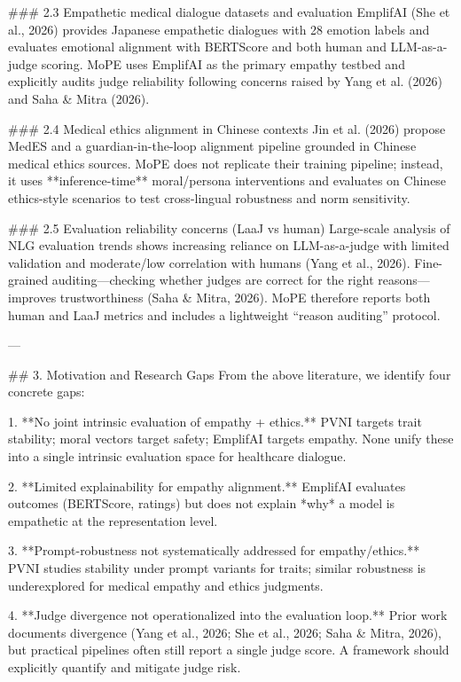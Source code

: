 ### 2.3 Empathetic medical dialogue datasets and evaluation  
EmplifAI (She et al., 2026) provides Japanese empathetic dialogues with 28 emotion labels and evaluates emotional alignment with BERTScore and both human and LLM-as-a-judge scoring. MoPE uses EmplifAI as the primary empathy testbed and explicitly audits judge reliability following concerns raised by Yang et al. (2026) and Saha & Mitra (2026).

### 2.4 Medical ethics alignment in Chinese contexts  
Jin et al. (2026) propose MedES and a guardian-in-the-loop alignment pipeline grounded in Chinese medical ethics sources. MoPE does not replicate their training pipeline; instead, it uses **inference-time** moral/persona interventions and evaluates on Chinese ethics-style scenarios to test cross-lingual robustness and norm sensitivity.

### 2.5 Evaluation reliability concerns (LaaJ vs human)  
Large-scale analysis of NLG evaluation trends shows increasing reliance on LLM-as-a-judge with limited validation and moderate/low correlation with humans (Yang et al., 2026). Fine-grained auditing—checking whether judges are correct for the right reasons—improves trustworthiness (Saha & Mitra, 2026). MoPE therefore reports both human and LaaJ metrics and includes a lightweight “reason auditing” protocol.

---

## 3. Motivation and Research Gaps  
From the above literature, we identify four concrete gaps:

1. **No joint intrinsic evaluation of empathy + ethics.** PVNI targets trait stability; moral vectors target safety; EmplifAI targets empathy. None unify these into a single intrinsic evaluation space for healthcare dialogue.

2. **Limited explainability for empathy alignment.** EmplifAI evaluates outcomes (BERTScore, ratings) but does not explain *why* a model is empathetic at the representation level.

3. **Prompt-robustness not systematically addressed for empathy/ethics.** PVNI studies stability under prompt variants for traits; similar robustness is underexplored for medical empathy and ethics judgments.

4. **Judge divergence not operationalized into the evaluation loop.** Prior work documents divergence (Yang et al., 2026; She et al., 2026; Saha & Mitra, 2026), but practical pipelines often still report a single judge score. A framework should explicitly quantify and mitigate judge risk.

